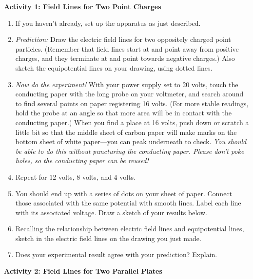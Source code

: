 \pagebreak[2]

\textbf{Activity 1: Field Lines for Two Point Charges}

\begin{enumerate}[labparts]
\item If you haven't already, set up the apparatus as just described.

\item \textit{Prediction:} Draw the electric field lines for two
oppositely charged point particles.  (Remember that field lines start at and point away from positive charges, and they terminate at and point towards negative charges.)  Also sketch the equipotential lines on your drawing, using dotted lines.
\answerspace{2in}

\item \textit{Now do the experiment!}  With your power supply set to 20 volts,
touch the conducting paper with the long probe on your voltmeter, and search around to find 
several points on 
paper registering 16 volts. (For more stable readings, hold the probe at an angle so that more area will be in contact with the conducting paper.)  When you find a place at 16 volts, push down or scratch a little bit 
so that the middle sheet of carbon paper will make marks on the bottom sheet of white paper---you 
can peak underneath to check.
\textit{You should be able to do this without puncturing the conducting paper.  Please don't poke holes, so the conducting paper can be reused!}

\item Repeat for 12 volts, 8 volts, and 4 volts.

\item You should end up with a series of dots on your sheet of paper. Connect
those associated with the same potential with smooth lines. Label each line 
with its associated voltage.  Draw a sketch of your results below.
\answerspace{2in}

\item Recalling the relationship between electric field lines and equipotential
lines, sketch in the electric field lines on the drawing you just made. 

\item Does your experimental result agree with your prediction? Explain.
\answerspace{1in}

\end{enumerate}

\pagebreak[2]
\textbf{Activity 2: Field Lines for Two Parallel Plates}

